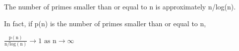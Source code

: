The number of primes smaller than or equal to n is approximately n/log(n). 
\par
In fact, if p(n) is the number of primes smaller than or equal to n, 
\par
 $ \frac{\mathrm{p(n)}}{\mathrm{n/log(n)}} \to 1 \text{   as }  \mathrm{n} \to \infty $